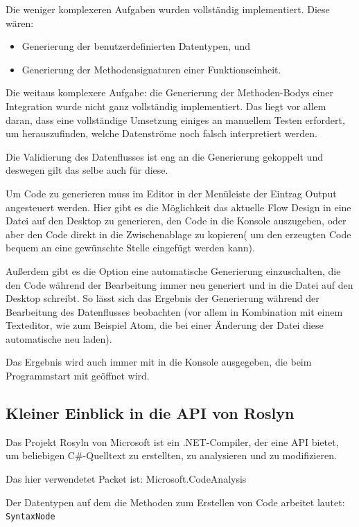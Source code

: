 Die weniger komplexeren Aufgaben wurden vollständig implementiert.
Diese wären: 
\begin{itemize}
	\item Generierung der benutzerdefinierten Datentypen, und 
	\item Generierung der Methodensignaturen einer Funktionseinheit.
\end{itemize}

Die weitaus komplexere Aufgabe: die Generierung der Methoden-Bodys einer Integration wurde nicht ganz vollständig implementiert.
Das liegt vor allem daran, dass eine vollständige Umsetzung einiges an manuellem Testen erfordert, um herauszufinden, welche Datenströme noch falsch interpretiert werden. 

Die Validierung des Datenflusses ist eng an die Generierung gekoppelt und deswegen gilt das selbe auch für diese. 

Um Code zu generieren muss im Editor in der Menüleiste der Eintrag Output angesteuert werden.
Hier gibt es die Möglichkeit das aktuelle Flow Design in eine Datei auf den Desktop zu
generieren, den Code in die Konsole auszugeben, oder aber den Code direkt in die Zwischenablage zu kopieren( um den erzeugten Code bequem an eine gewünschte Stelle eingefügt werden kann).

Außerdem gibt es die Option eine automatische Generierung einzuschalten, die
den Code während der Bearbeitung immer neu generiert und in die Datei
auf den Desktop schreibt. So lässt sich das Ergebnis der Generierung während der Bearbeitung
des Datenflusses beobachten (vor allem in Kombination mit einem
Texteditor, wie zum Beispiel Atom, die bei einer Änderung der Datei diese automatische neu laden).

Das Ergebnis wird auch immer mit in die Konsole ausgegeben, die beim
Programmstart mit geöffnet wird.


\subsection{Kleiner Einblick in die API von Roslyn}

Das Projekt Rosyln von Microsoft ist ein .NET-Compiler, der eine API bietet, um beliebigen C\#-Quelltext zu erstellten,
zu analysieren und zu modifizieren.

Das hier verwendetet Packet ist: Microsoft.CodeAnalysis

Der Datentypen auf dem die Methoden zum Erstellen von Code arbeitet lautet:
\texttt{SyntaxNode} 

